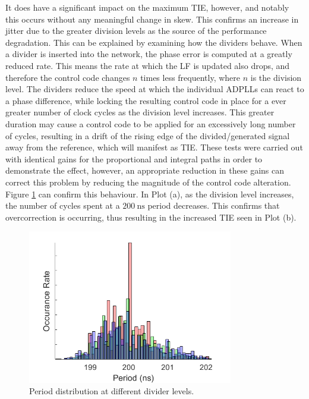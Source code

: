 It does have a significant impact on the maximum \ac{TIE}, however, and notably this occurs without any meaningful change in skew. This confirms an increase in jitter due to the greater division levels as the source of the performance degradation. This can be explained by examining how the dividers behave. When a divider is inserted into the network, the phase error is computed at a greatly reduced rate. This means the rate at which the \ac{LF} is updated also drops, and therefore the control code changes $n$ times less frequently, where $n$ is the division level. The dividers reduce the speed at which the individual \acp{ADPLL} can react to a phase difference, while locking the resulting control code in place for a ever greater number of clock cycles as the division level increases. This greater duration may cause a control code to be applied for an excessively long number of cycles, resulting in a drift of the rising edge of the divided/generated signal away from the reference, which will manifest as \ac{TIE}. These tests were carried out with identical gains for the proportional and integral paths in order to demonstrate the effect, however, an appropriate reduction in these gains can correct this problem by reducing the magnitude of the control code alteration.
Figure \ref{fig:todo_div} can confirm this behaviour. In Plot (a), as the division level increases, the number of cycles spent at a $200~\si{\nano\second}$ period decreases. This confirms that overcorrection is occurring, thus resulting in the increased \ac{TIE} seen in Plot (b).
\begin{figure}[h]%
    \centering
    \includegraphics[width=0.8\textwidth]{../dist2}
    \caption[Period distribution at different divider levels]{Period distribution at different divider levels.}    
    \label{fig:todo_div}
\end{figure}

